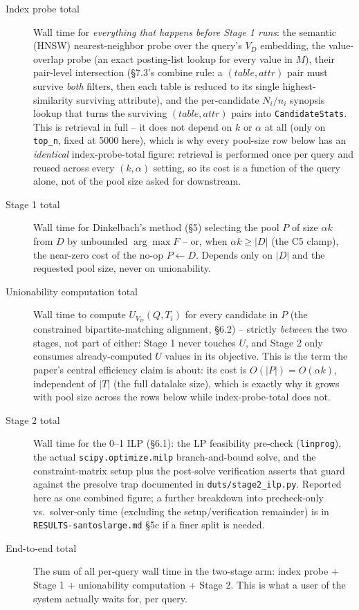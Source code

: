 \begin{description}
  \item[Index probe total] Wall time for \emph{everything that happens before Stage 1
    runs}: the semantic (HNSW) nearest-neighbor probe over the query's $V_D$
    embedding, the value-overlap probe (an exact posting-list lookup for every value
    in $M$), their pair-level intersection (\S7.3's combine rule: a $(table,attr)$
    pair must survive \emph{both} filters, then each table is reduced to its single
    highest-similarity surviving attribute), and the per-candidate $N_i/n_i$
    synopsis lookup that turns the surviving $(table,attr)$ pairs into
    \texttt{CandidateStats}. This is retrieval in full -- it does not depend on
    $k$ or $\alpha$ at all (only on \texttt{top\_n}, fixed at 5000 here), which is
    why every pool-size row below has an \emph{identical} index-probe-total figure:
    retrieval is performed once per query and reused across every $(k,\alpha)$
    setting, so its cost is a function of the query alone, not of the pool size
    asked for downstream.
  \item[Stage 1 total] Wall time for Dinkelbach's method (\S5) selecting the pool
    $P$ of size $\alpha k$ from $D$ by unbounded $\arg\max F$ -- or, when
    $\alpha k \ge |D|$ (the C5 clamp), the near-zero cost of the no-op
    $P \gets D$. Depends only on $|D|$ and the requested pool size, never on
    unionability.
  \item[Unionability computation total] Wall time to compute $U_{V_D}(Q,T_i)$ for
    every candidate in $P$ (the constrained bipartite-matching alignment, \S6.2) --
    strictly \emph{between} the two stages, not part of either: Stage 1 never touches
    $U$, and Stage 2 only consumes already-computed $U$ values in its objective. This
    is the term the paper's central efficiency claim is about: its cost is
    $O(|P|) = O(\alpha k)$, independent of $|T|$ (the full datalake size), which is
    exactly why it grows with pool size across the rows below while index-probe-total
    does not.
  \item[Stage 2 total] Wall time for the 0--1 ILP (\S6.1): the LP feasibility
    pre-check (\texttt{linprog}), the actual \texttt{scipy.optimize.milp}
    branch-and-bound solve, and the constraint-matrix setup plus the post-solve
    verification asserts that guard against the presolve trap documented in
    \texttt{duts/stage2\_ilp.py}. Reported here as one combined figure; a further
    breakdown into precheck-only vs.\ solver-only time (excluding the setup/verification
    remainder) is in \texttt{RESULTS-santoslarge.md} \S5c if a finer split is needed.
  \item[End-to-end total] The sum of all per-query wall time in the two-stage arm:
    index probe + Stage 1 + unionability computation + Stage 2. This is what a user
    of the system actually waits for, per query.
\end{description}


